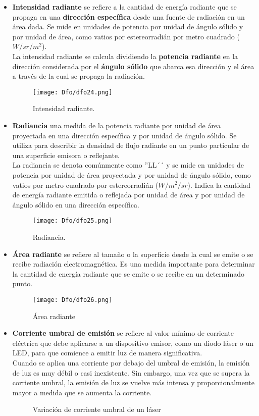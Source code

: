 \documentclass[12pt,fleqn,a4paper,oneside]{LegrandOrangeBook}
\begin{document}
\begin{itemize}
\item \textbf{Intensidad radiante} se refiere a la cantidad de energía radiante que se propaga en una \textbf{dirección específica} desde una fuente de radiación en un área dada. Se mide en unidades de potencia por unidad de ángulo sólido y por unidad de área, como vatios por estereorradián por metro cuadrado ($W/sr/m^2$).\\
La intensidad radiante se calcula dividiendo la\textbf{ potencia radiante} en la dirección considerada por el \textbf{ángulo sólido} que abarca esa dirección y el área a través de la cual se propaga la radiación.
\begin{figure}[H]
\centering
\texttt{[image: Dfo/dfo24.png]}
\caption{Intensidad radiante.}
\end{figure}

\item \textbf{Radiancia} una medida de la potencia radiante por unidad de área proyectada en una dirección específica y por unidad de ángulo sólido. Se utiliza para describir la densidad de flujo radiante en un punto particular de una superficie emisora o reflejante.\\
La radiancia se denota comúnmente como ''LL´´ y se mide en unidades de potencia por unidad de área proyectada y por unidad de ángulo sólido, como vatios por metro cuadrado por estereorradián ($W/m^2/sr$). Indica la cantidad de energía radiante emitida o reflejada por unidad de área y por unidad de ángulo sólido en una dirección específica.
\begin{figure}[H]
\centering
\texttt{[image: Dfo/dfo25.png]}
\caption{Radiancia.}
\end{figure}

\item \textbf{Área radiante} se refiere al tamaño o la superficie desde la cual se emite o se recibe radiación electromagnética. Es una medida importante para determinar la cantidad de energía radiante que se emite o se recibe en un determinado punto.
\begin{figure}[H]
\centering
\texttt{[image: Dfo/dfo26.png]}
\caption{Área radiante}
\end{figure}

\item \textbf{Corriente umbral de emisión} se refiere al valor mínimo de corriente eléctrica que debe aplicarse a un dispositivo emisor, como un diodo láser o un LED, para que comience a emitir luz de manera significativa.\\
Cuando se aplica una corriente por debajo del umbral de emisión, la emisión de luz es muy débil o casi inexistente. Sin embargo, una vez que se supera la corriente umbral, la emisión de luz se vuelve más intensa y proporcionalmente mayor a medida que se aumenta la corriente.
\begin{figure}[H]
\centering
{}
\caption{Variación de corriente umbral de un láser}
\end{figure}


\end{itemize}
\end{document}
